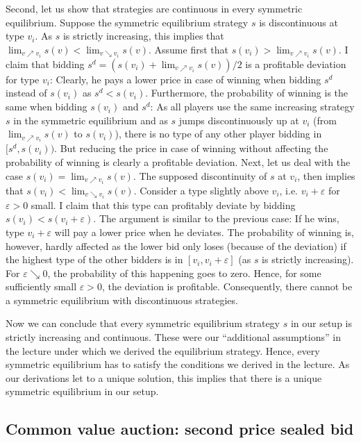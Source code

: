 \documentclass[a4paper,11pt]{article}
\begin{document}
Second, let us show that strategies are continuous in every symmetric equilibrium. Suppose the symmetric equilibrium strategy $s$ is discontinuous at type $v_i$. As $s$ is strictly increasing, this implies that $\lim_{v\nearrow v_i}s(v)<\lim_{v\searrow v_i}s(v)$. Assume first that $s(v_i)>\lim_{v\nearrow v_i}s(v)$. I claim that bidding $s^d=\left(s(v_i)+\lim_{v\nearrow v_i}s(v)\right)/2$ is a profitable deviation for type $v_i$: Clearly, he pays a lower price in case of winning when bidding $s^d$ instead of $s(v_i)$ as $s^d<s(v_i)$. Furthermore, the probability of winning is the same when bidding $s(v_i)$ and $s^d$: As all players use the same increasing strategy $s$ in the symmetric equilibrium and as $s$ jumps discontinuously up at $v_i$ (from $\lim_{v\nearrow v_i}s(v)$ to $s(v_i)$), there is no type of any other player bidding in $[s^d,s(v_i))$. But reducing the price in case of winning without affecting the probability of winning is clearly a profitable deviation. Next, let us deal with the case $s(v_i)=\lim_{v\nearrow v_i}s(v)$. The supposed discontinuity of $s$ at $v_i$, then implies that $s(v_i)<\lim_{v\searrow v_i}s(v)$. Consider a type slightly above $v_i$, i.e. $v_i+\varepsilon $ for $\varepsilon >0$ small. I claim that this type can profitably deviate by bidding $s(v_i)<s(v_i+\varepsilon )$. The argument is similar to the previous case: If he wins, type $v_i+\varepsilon $ will pay a lower price when he deviates. The probability of winning is, however, hardly affected as the lower bid only loses (because of the deviation) if the highest type of the other bidders is in $[v_i,v_i+\varepsilon ]$ (as $s$ is strictly increasing). For $\varepsilon\searrow 0 $,  the probability of this happening goes to zero. Hence, for some sufficiently small $\varepsilon >0$, the deviation is profitable. Consequently, there cannot be a symmetric equilibrium with discontinuous strategies.

Now we can conclude that every symmetric equilibrium strategy $s$ in our setup is strictly increasing and continuous. These were our ``additional assumptions'' in the lecture under which we derived the equilibrium strategy. Hence, every symmetric equilibrium has to satisfy the conditions we derived in the lecture. As our derivations let to a unique solution, this implies that there is a unique symmetric equilibrium in our setup.



\subsection{Common value auction: second price sealed bid}
\label{sec:comm-value-auct}
\end{document}
